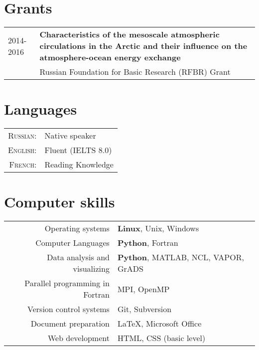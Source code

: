 \documentclass[a4paper,10pt]{article}
\newlength{\mycol}
\begin{document}
\section{Grants}
\begin{tabu} to 	
 2014-2016 & \textbf{Characteristics of the mesoscale atmospheric circulations in the Arctic and their influence on the atmosphere-ocean energy exchange} \\
& Russian Foundation for Basic Research (RFBR) Grant
\end{tabu}

\section{Languages}
\begin{tabular}{rp{10cm}}
\textsc{Russian:} & Native speaker \\
\textsc{English:} & Fluent (IELTS 8.0)\\
\textsc{French:} & Reading Knowledge\\
\end{tabular}

\section{Computer skills}
\begin{tabular}{rp{10cm}}
	Operating systems & \textbf{Linux}, Unix, Windows \\
	Computer Languages & \textbf{Python}, Fortran \\
	Data analysis and visualizing & \textbf{Python}, MATLAB, NCL, VAPOR, GrADS \\
	Parallel programming in Fortran & MPI, OpenMP \\
	Version control systems & Git, Subversion \\
	Document preparation & \LaTeX, Microsoft Office \\
	Web development & HTML, CSS (basic level)
\end{tabular}
\end{document}
